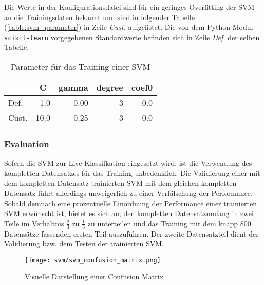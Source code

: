 Die Werte in der Konfigurationsdatei sind für ein geringes Overfitting der \ac{SVM} an die Trainingsdaten bekannt und sind in folgender Tabelle (\autoref{table:svm_parameter}) in Zeile \textit{Cust.} aufgelistet.
Die von dem Python-Modul \texttt{scikit-learn} vorgegebenen Standardwerte befinden sich in Zeile \textit{Def.} der selben Tabelle.

\begin{table}[h]
\centering
\begin{tabular}{lrrrr}
\hline
   & \multicolumn{1}{c}{\textbf{C}} & \multicolumn{1}{c}{\textbf{gamma}} & \multicolumn{1}{c}{\textbf{degree}} & \multicolumn{1}{c}{\textbf{coef0}} \\
 \hline
  Def. & 1.0 & 0.00 & 3 & 0.0 \\
 \hline
  Cust. & 10.0 & 0.25 & 3 & 0.0 \\
\hline
\end{tabular}
\caption[Parameter für das Training einer SVM]{Parameter für das Training einer SVM}
\label{tab:svm_parameter}
\end{table}


\subsubsection{Evaluation}\label{sec:svm_evaluation}
Sofern die \ac{SVM} zur Live-Klassifkation eingesetzt wird, ist die Verwendung des kompletten Datensatzes für das Training unbedenklich.
Die Validierung einer mit dem kompletten Datensatz trainierten \ac{SVM} mit dem gleichen kompletten Datensatz führt allerdings unweigerlich zu einer Verfälschung der Performance.
Sobald demnach eine prozentuelle Einordnung der Performance einer trainierten \ac{SVM} erwünscht ist, bietet es sich an, den kompletten Datensatzumfang in zwei Teile im Verhältnis $\frac{2}{3}$ zu $\frac{1}{3}$ zu unterteilen und das Training mit dem knapp 800 Datensätze fassenden ersten Teil auszuführen.
Der zweite Datensatzteil dient der Validierung bzw. dem Testen der trainierten \ac{SVM}.

\begin{figure}[htbp] \centering
    \texttt{[image: svm/svm\_confusion\_matrix.png]}
    \caption{Visuelle Darstellung einer Confusion Matrix}
    \label{fig:svm_confusion_matrix}
\end{figure}


